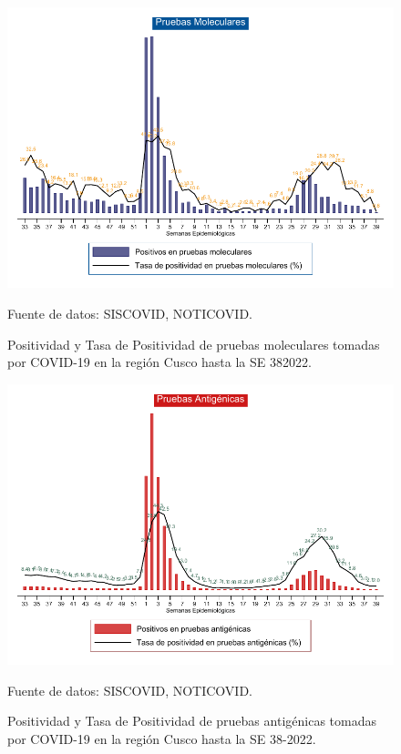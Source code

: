\documentclass[12pt,a4paper,openany]{book}
\begin{document}
	
	\begin{landscape}
		\begin{figure}[h]
			\caption{Positividad y Tasa de Positividad de pruebas moleculares tomadas por COVID-19 en la región Cusco hasta la SE 382022.}\label{fig:positividad_pcr}
			\begin{center}
				\includegraphics[width=0.90\linewidth]{../figuras/positividad_pcr.pdf}
			\end{center}
			{\footnotesize {Fuente de datos: SISCOVID, NOTICOVID.}}
		\end{figure}
	\end{landscape}
	\clearpage
	\begin{landscape}
		
		\begin{figure}[h]
			\caption{ Positividad y Tasa de Positividad de pruebas antigénicas tomadas por COVID-19 en la región Cusco hasta la SE 38-2022.}\label{fig:positividad_ag}
			\begin{center}
				\includegraphics[width=0.90\linewidth]{../figuras/positividad_ag.pdf}
			\end{center}
			{\footnotesize {Fuente de datos: SISCOVID, NOTICOVID.}}
		\end{figure}
	\end{landscape}
\end{document}
